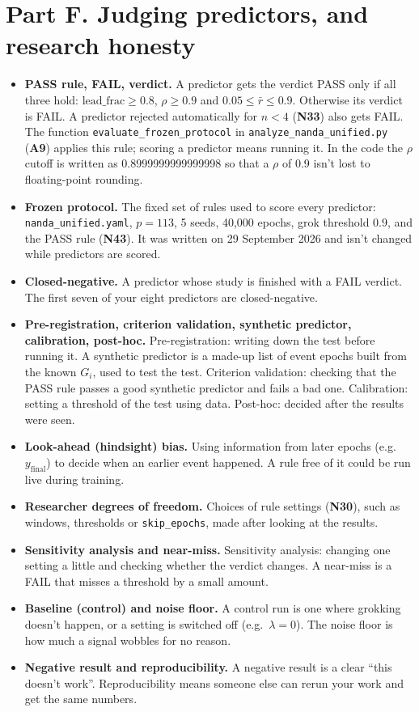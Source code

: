 \documentclass[11pt,a4paper,oneside,openany]{report}
\newcommand{\leadfrac}{\mathrm{lead\_frac}}
\newcommand{\rbar}{\bar{r}}
\newcommand{\yfinal}{y_{\mathrm{final}}}
\newcommand{\code}[1]{\texttt{#1}}
\newcommand{\gl}[1]{\textbf{#1}}   %
\newenvironment{glist}{\begin{itemize}\setlength{\itemsep}{2pt}\setlength{\parskip}{1pt}}{\end{itemize}}
\begin{document}
\section*{Part F. Judging predictors, and research honesty}

\begin{glist}
\item[\gl{N43}] \textbf{PASS rule, FAIL, verdict.} A predictor gets the verdict PASS only if all three hold: $\leadfrac \ge 0.8$, $\rho \ge 0.9$ and $0.05 \le \rbar \le 0.9$. Otherwise its verdict is FAIL. A predictor rejected automatically for $n < 4$ (\gl{N33}) also gets FAIL. The function \code{evaluate\_\allowbreak{}frozen\_\allowbreak{}protocol} in \code{analyze\_\allowbreak{}nanda\_\allowbreak{}unified.py} (\gl{A9}) applies this rule; scoring a predictor means running it. In the code the $\rho$ cutoff is written as 0.8999999999999998 so that a $\rho$ of 0.9 isn't lost to floating-point rounding.
\item[\gl{N44}] \textbf{Frozen protocol.} The fixed set of rules used to score every predictor: \code{nanda\_\allowbreak{}unified.yaml}, $p = 113$, 5 seeds, 40{,}000 epochs, grok threshold 0.9, and the PASS rule (\gl{N43}). It was written on 29 September 2026 and isn't changed while predictors are scored.
\item[\gl{N45}] \textbf{Closed-negative.} A predictor whose study is finished with a FAIL verdict. The first seven of your eight predictors are closed-negative.
\item[\gl{N46}] \textbf{Pre-registration, criterion validation, synthetic predictor, calibration, post-hoc.} Pre-registration: writing down the test before running it. A synthetic predictor is a made-up list of event epochs built from the known $G_i$, used to test the test. Criterion validation: checking that the PASS rule passes a good synthetic predictor and fails a bad one. Calibration: setting a threshold of the test using data. Post-hoc: decided after the results were seen.
\item[\gl{N47}] \textbf{Look-ahead (hindsight) bias.} Using information from later epochs (e.g.\ $\yfinal$) to decide when an earlier event happened. A rule free of it could be run live during training.
\item[\gl{N48}] \textbf{Researcher degrees of freedom.} Choices of rule settings (\gl{N30}), such as windows, thresholds or \code{skip\_\allowbreak{}epochs}, made after looking at the results.
\item[\gl{N49}] \textbf{Sensitivity analysis and near-miss.} Sensitivity analysis: changing one setting a little and checking whether the verdict changes. A near-miss is a FAIL that misses a threshold by a small amount.
\item[\gl{N50}] \textbf{Baseline (control) and noise floor.} A control run is one where grokking doesn't happen, or a setting is switched off (e.g.\ $\lambda = 0$). The noise floor is how much a signal wobbles for no reason.
\item[\gl{N51}] \textbf{Negative result and reproducibility.} A negative result is a clear ``this doesn't work''. Reproducibility means someone else can rerun your work and get the same numbers.
\end{glist}
\end{document}
